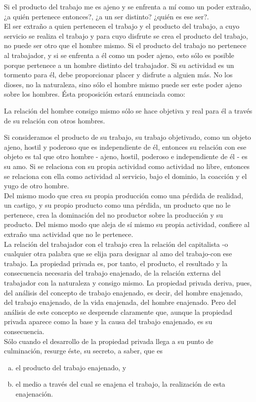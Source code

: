 Si el producto del trabajo me es ajeno y se enfrenta a mí como un poder extraño, ¿a quién pertenece entonces?, ¿a un ser distinto? ¿quién es ese ser?.\\

El ser extraño a quien pertenecen el trabajo y el producto del trabajo, a cuyo servicio se realiza el trabajo y para cuyo disfrute se crea el producto del trabajo, no puede ser otro que el hombre mismo. Si el producto del trabajo no pertenece al trabajador, y si se enfrenta a él como un poder ajeno, esto sólo es posible porque pertenece a un hombre distinto del trabajador. Si su actividad es un tormento para él, debe proporcionar placer y disfrute a alguien más. No los dioses, no la naturaleza, sino sólo el hombre mismo puede ser este poder ajeno sobre los hombres. Ésta proposición estará enunciada como:
\begin{center}
    La relación del hombre consigo mismo sólo se hace objetiva y real para él a través de su relación con otros hombres.
\end{center}

Si consideramos el producto de su trabajo, su trabajo objetivado, como un objeto ajeno, hostil y poderoso que es independiente de él, entonces su relación con ese objeto es tal que otro hombre - ajeno, hostil, poderoso e independiente de él - es su amo. Si se relaciona con su propia actividad como actividad no libre, entonces se relaciona con ella como actividad al servicio, bajo el dominio, la coacción y el yugo de otro hombre.\\
Del mismo modo que crea su propia producción como una pérdida de realidad, un castigo, y su propio producto como una pérdida, un producto que no le pertenece, crea la dominación del no productor sobre la producción y su producto. Del mismo modo que aleja de sí mismo su propia actividad, confiere al extraño una actividad que no le pertenece.\\

La relación del trabajador con el trabajo crea la relación del capitalista -o cualquier otra palabra que se elija para designar al amo del trabajo-con ese trabajo. La propiedad privada es, por tanto, el producto, el resultado y la consecuencia necesaria del trabajo enajenado, de la relación externa del trabajador con la naturaleza y consigo mismo. La propiedad privada deriva, pues, del análisis del concepto de trabajo enajenado, es decir, del hombre enajenado, del trabajo enajenado, de la vida enajenada, del hombre enajenado. Pero del análisis de este concepto se desprende claramente que, aunque la propiedad privada aparece como la base y la causa del trabajo enajenado, es su consecuencia.\\
Sólo cuando el desarrollo de la propiedad privada llega a su punto de culminación, resurge éste, su secreto, a saber, que es
\begin{enumerate}[a)]
    \item el producto del trabajo enajenado, y
    \item el medio a través del cual se enajena el trabajo, la realización de esta enajenación.
\end{enumerate}

